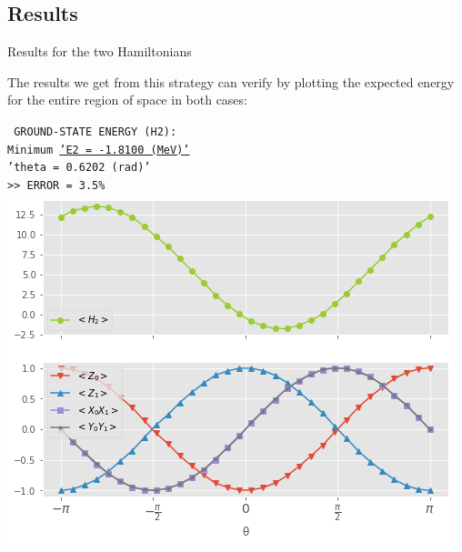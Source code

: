 \documentclass[9pt, handout, aspectratio=169]{beamer}		%
\begin{document}

	\subsection{Results}

	\begin{frame}{Results for the two Hamiltonians}

		The results we get from this strategy can verify by plotting the expected energy for the entire region of space in both cases:

		\begin{multicols}{2}

			\begin{center}
				\texttt{ \small
					GROUND-STATE ENERGY (H2): \\
					Minimum \underline{'E2 = -1.8100 (MeV)'} \\
					'theta = 0.6202 (rad)' \\
					>> ERROR = 3.5\% } \\
				\bigskip
				\includegraphics[height=.40\paperheight]{Figures/h2_result}
			\end{center}

			\columnbreak


\end{multicols}
\end{frame}
\end{document}
